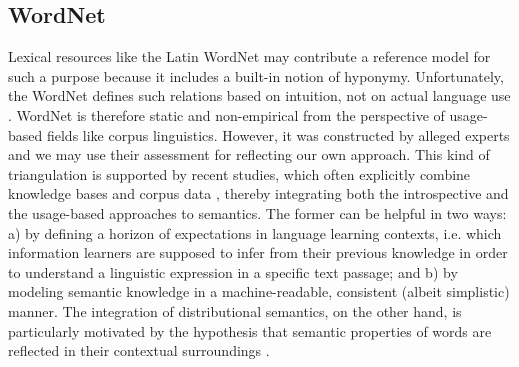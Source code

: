 \documentclass[runningheads]{llncs}
\begin{document}
\subsection{WordNet}
\label{WordNet}
Lexical resources like the Latin WordNet \parencite{minozziLatinWordNetProject2010} may contribute a reference model for such a purpose because it includes a built-in notion of hyponymy. Unfortunately, the WordNet defines such relations based on intuition, not on actual language use \parencite[315]{fellbaumChallengesMultilingualWordnet2012}. WordNet is therefore static and non-empirical from the perspective of usage-based fields like corpus linguistics. However, it was constructed by alleged experts and we may use their assessment for reflecting our own approach. This kind of triangulation is supported by recent studies, which often explicitly combine knowledge bases and corpus data \parencite[984-988]{onoWordEmbeddingbasedAntonym2015}, thereby integrating both the introspective and the usage-based approaches to semantics. The former can be helpful in two ways: a) by defining a horizon of expectations in language learning contexts, i.e. which information learners are supposed to infer from their previous knowledge in order to understand a linguistic expression in a specific text passage; and b) by modeling semantic knowledge in a machine-readable, consistent (albeit simplistic) manner. The integration of distributional semantics, on the other hand, is particularly motivated by the hypothesis that semantic properties of words are reflected in their contextual surroundings \parencite[59]{griesBehavioralProfilesCorpusbased2009}. 
\end{document}
